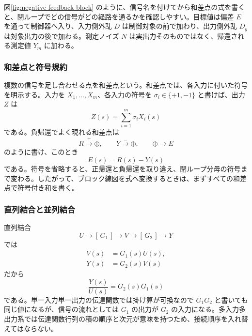 図\ref{fig:negative-feedback-block} のように、信号名を付けてから和差点の式を書くと、閉ループでどの信号がどの経路を通るかを確認しやすい。目標値は偏差 $E$ を通って制御器へ入り、入力側外乱 $D$ は制御対象の前で加わり、出力側外乱 $D_y$ は対象出力の後で加わる。測定ノイズ $N$ は実出力そのものではなく、帰還される測定値 $Y_m$ に加わる。

\subsubsection{和差点と符号規約}

複数の信号を足し合わせる点を和差点という。和差点では、各入力に付いた符号を明示する。入力を $X_1,\ldots,X_m$、各入力の符号を $\sigma_i\in\{+1,-1\}$ と書けば、出力 $Z$ は
\begin{equation}
  Z(s)=\sum_{i=1}^{m}\sigma_i X_i(s)
  \label{eq:summing-junction}
\end{equation}
である。負帰還でよく現れる和差点は
\[
  R \stackrel{+}{\longrightarrow} \oplus,\qquad
  Y \stackrel{-}{\longrightarrow} \oplus,\qquad
  \oplus \longrightarrow E
\]
のように書け、このとき
\begin{equation}
  E(s)=R(s)-Y(s)
  \label{eq:unity-error}
\end{equation}
である。符号を省略すると、正帰還と負帰還を取り違え、閉ループ分母の符号まで変わる。したがって、ブロック線図を式へ変換するときは、まずすべての和差点で符号付き和を書く。

\subsubsection{直列結合と並列結合}

直列結合
\[
  U \longrightarrow [\,G_1\,] \longrightarrow V
    \longrightarrow [\,G_2\,] \longrightarrow Y
\]
では
\begin{align}
  V(s)&=G_1(s)U(s),\\
  Y(s)&=G_2(s)V(s)
\end{align}
だから
\begin{equation}
  \frac{Y(s)}{U(s)}=G_2(s)G_1(s)
  \label{eq:series-interconnection}
\end{equation}
である。単一入力単一出力の伝達関数では掛け算が可換なので $G_1G_2$ と書いても同じ値になるが、信号の流れとしては $G_1$ の出力が $G_2$ の入力になる。多入力多出力系では伝達関数行列の積の順序と次元が意味を持つため、接続順序を入れ替えてはならない。

